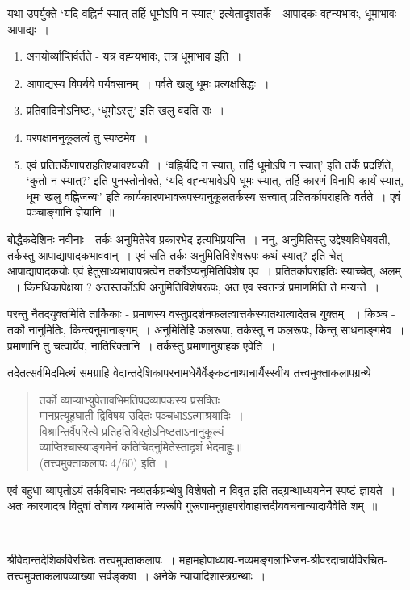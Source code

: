 {यथा उपर्युक्ते ‘यदि वह्निर्न स्यात् तर्हि धूमोऽपि न स्यात्' इत्येतादृशतर्के -  आपादकः वह्न्यभावः, धूमाभावः आपाद्यः~। 
\begin{enumerate}
\itemsep=1pt
\item	अनयोर्व्याप्तिर्वर्तते - यत्र वह्न्यभावः, तत्र धूमाभाव इति~। 
\item	आपाद्यस्य विपर्यये पर्यवसानम्~। पर्वते खलु धूमः प्रत्यक्षसिद्धः~। 
\item	प्रतिवादिनोऽनिष्टः, ‘धूमोऽस्तु' इति खलु वदति सः~। 
\item	परपक्षाननुकूलत्वं तु स्पष्टमेव~। 
\item	एवं प्रतितर्केणापराहतिश्चावश्यकी~। ‘वह्निर्यदि न स्यात्, तर्हि धूमोऽपि न स्यात्' इति तर्के प्रदर्शिते, ‘कुतो न स्यात्?' इति पुनस्तोनोक्ते, ‘यदि वह्न्यभावेऽपि धूमः स्यात्, तर्हि कारणं विनापि कार्यं स्यात्, धूमः खलु वह्निजन्यः' इति कार्यकारणभावरूपस्यानुकूलतर्कस्य सत्त्वात् प्रतितर्कापराहतिः वर्तते~। एवं पञ्चाङ्गानि ज्ञेयानि~॥ 
\end{enumerate}
बोद्धैकदेशिनः नवीनाः  - तर्कः अनुमितेरेव प्रकारभेद इत्यभिप्रयन्ति~। ननु, अनुमितिस्तु उद्देश्यविधेयवती, तर्कस्तु आपाद्यापादकभाववान्~। एवं सति तर्कः अनुमितिविशेषरूपः कथं स्यात्? इति चेत् - आपाद्यापादकयोः एवं हेतुसाध्यभावापन्नत्वेन तर्कोऽप्यनुमितिविशेष एव~। प्रतितर्कापराहतिः स्याच्चेत्, अलम् ~। किमधिकापेक्षया ? अतस्तर्कोऽपि अनुमितिविशेषरूपः, अत एव स्वतन्त्रं प्रमाणमिति ते मन्यन्ते~। 

परन्तु नैतदयुक्तमिति तार्किकाः - प्रमाणस्य वस्तुप्रदर्शनफलत्वात्तर्कस्यातथात्वादेतन्न युक्तम् ~। किञ्च - तर्को नानुमितिः, किन्त्वनुमानाङ्गम्~। अनुमितिर्हि फलरूपा, तर्कस्तु न फलरूपः, किन्तु साधनाङ्गमेव~। प्रमाणानि तु चत्वार्येव, नातिरिक्तानि~। तर्कस्तु प्रमाणानुग्राहक एवेति~। 

तदेतत्सर्वमिदमित्थं समग्राहि वेदान्तदेशिकापरनामधेयैर्वेङ्कटनाथाचार्यैस्स्वीय तत्त्वमुक्ताकलापग्रन्थे \
\begin{verse}
तर्को व्याप्याभ्युपेतावभिमतिपदव्यापकस्य प्रसक्तिः\\
मानप्रत्यूहघाती द्विविषय उदितः पञ्चधाऽऽत्माश्रयादिः~। \\
विश्रान्तिर्वैपरित्ये प्रतिहतिविरहोऽनिष्टताऽनानुकूल्यं\\
व्याप्तिश्चास्याङ्गमेनं कतिचिदनुमितेस्तादृशं भेदमाहुः॥\\
\hspace{5cm}(तत्त्वमुक्ताकलापः  4/60) इति~। 
\end{verse}
एवं बहुधा व्यापृतोऽयं तर्कविचारः नव्यतर्कग्रन्थेषु विशेषतो न विवृत इति तद्ग्रन्थाध्ययनेन स्पष्टं ज्ञायते~। अतः कारणादत्र विदुषां तोषाय यथामति न्यरूपि गुरूणामनुग्रहपरीवाहात्तदीय\-वचनान्यादायैवेति शम्~॥

~\\[-2cm]
\begin{thebibliography}{99}
\itemsep=1pt
	श्रीवेदान्तदेशिकविरचितः तत्त्वमुक्ताकलापः~। 
\bibitem{chap21-key2}	महामहोपाध्याय-नव्यमङ्गलाभिजन-श्रीवरदाचार्यविरचित-तत्त्वमुक्ताकलापव्याख्या सर्वङ्कषा~। 
\bibitem{chap21-key3}	अनेके न्यायादिशास्त्रग्रन्थाः~। 
\end{thebibliography}
\articleend
}
